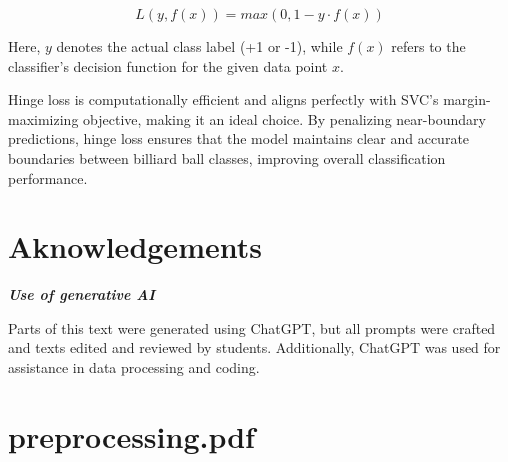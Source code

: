 \documentclass{article}
\begin{document}
\begin{equation}
    L(y, f(x)) = max(0, 1-y \cdot f(x))
\end{equation}

Here, $y$ denotes the actual class label (+1 or -1), while $f(x)$ refers to the classifier's decision function for the given data point $x$.

Hinge loss is computationally efficient and aligns perfectly with SVC's margin-maximizing objective, making it an ideal choice. By penalizing 
near-boundary predictions, hinge loss ensures that the model maintains clear and accurate boundaries between billiard ball classes, improving 
overall classification performance. \cite{unknownMachineLearningApproach2023, bartlettClassificationRejectOption2008}

\pagebreak
\section{Aknowledgements}
\textbf{\textit{Use of generative AI}}

Parts of this text were generated using ChatGPT, but all prompts were crafted and texts edited and reviewed by students. Additionally, 
ChatGPT was used for assistance in data processing and coding.


\printbibliography


\appendix
\section{preprocessing.pdf}


\end{document}
